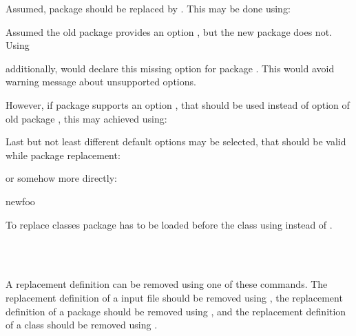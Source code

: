 \begin{Example}
  Assumed, package  should be replaced by
  . This may be done using:
\begin{lstcode}
\end{lstcode}
  Assumed the old package provides an option , but the new
  package does not. Using
\begin{lstcode}
\end{lstcode}
  additionally, would declare this missing option for package
  . This would avoid warning message about unsupported
  options.

  However, if package  supports an option ,
  that should be used instead of option  of old package
  , this may achieved using:
\begin{lstcode}
\end{lstcode}
  Last but not least different default options may be selected, that should be
  valid while package replacement:
\begin{lstcode}
\end{lstcode}
  or somehow more directly:
\begin{lstcode}
                       {newfoo}%
\end{lstcode}
\end{Example}

To replace classes package  has to be loaded before the
class using  instead of .
%
%
%

\begin{Declaration}
  \\
  \\
\end{Declaration}
%
%
%
A replacement definition can be removed
using one of these commands. The replacement definition of a input file should
be removed using , the replacement definition of a
package should be removed using , and the replacement
definition of a class should be removed using .%
%
%
%


